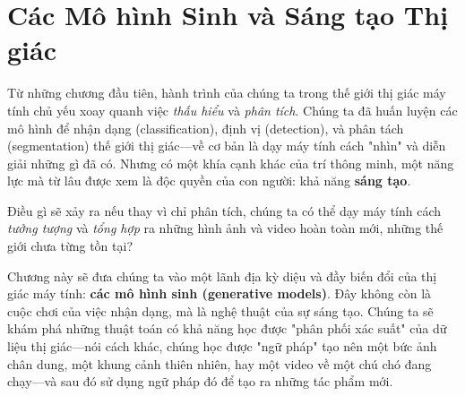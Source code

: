 \chapter{Các Mô hình Sinh và Sáng tạo Thị giác}
\label{chap:generative_models}

Từ những chương đầu tiên, hành trình của chúng ta trong thế giới thị giác máy tính chủ yếu xoay quanh việc \textit{thấu hiểu} và \textit{phân tích}. Chúng ta đã huấn luyện các mô hình để nhận dạng (classification), định vị (detection), và phân tách (segmentation) thế giới thị giác—về cơ bản là dạy máy tính cách "nhìn" và diễn giải những gì đã có. Nhưng có một khía cạnh khác của trí thông minh, một năng lực mà từ lâu được xem là độc quyền của con người: khả năng \textbf{sáng tạo}.

Điều gì sẽ xảy ra nếu thay vì chỉ phân tích, chúng ta có thể dạy máy tính cách \textit{tưởng tượng} và \textit{tổng hợp} ra những hình ảnh và video hoàn toàn mới, những thế giới chưa từng tồn tại?

Chương này sẽ đưa chúng ta vào một lãnh địa kỳ diệu và đầy biến đổi của thị giác máy tính: \textbf{các mô hình sinh (generative models)}. Đây không còn là cuộc chơi của việc nhận dạng, mà là nghệ thuật của sự sáng tạo. Chúng ta sẽ khám phá những thuật toán có khả năng học được "phân phối xác suất" của dữ liệu thị giác—nói cách khác, chúng học được "ngữ pháp" tạo nên một bức ảnh chân dung, một khung cảnh thiên nhiên, hay một video về một chú chó đang chạy—và sau đó sử dụng ngữ pháp đó để tạo ra những tác phẩm mới.

